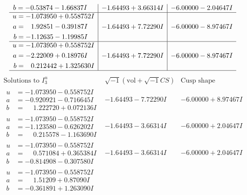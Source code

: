 \documentclass[1p]{elsarticle_modified}
\theoremstyle{definition}
\newcommand{\I}{\sqrt{-1}}
\begin{document}
$$\begin{array}{c|c|c}
\begin{aligned}
b &= -0.53874 - 1.66837 I\end{aligned}
 & -1.64493 + 3.66314 I & -6.00000 - 2.04647 I \\ \hline\begin{aligned}
u &= -1.073950 + 0.558752 I \\
a &= \phantom{-}1.92851 - 0.39187 I \\
b &= -1.12635 - 1.19985 I\end{aligned}
 & -1.64493 + 7.72290 I & -6.00000 - 8.97467 I \\ \hline\begin{aligned}
u &= -1.073950 + 0.558752 I \\
a &= -2.22009 + 0.18976 I \\
b &= \phantom{-}0.212442 + 1.325630 I\end{aligned}
 & -1.64493 + 7.72290 I & -6.00000 - 8.97467 I\\
 \hline 
 \end{array}$$\newpage$$\begin{array}{c|c|c}  
\text{Solutions to }I^u_{3}& \I (\text{vol} + \sqrt{-1}CS) & \text{Cusp shape}\\
 \hline 
\begin{aligned}
u &= -1.073950 - 0.558752 I \\
a &= -0.920921 - 0.716645 I \\
b &= \phantom{-}1.222720 + 0.072136 I\end{aligned}
 & -1.64493 - 7.72290 I & -6.00000 + 8.97467 I \\ \hline\begin{aligned}
u &= -1.073950 - 0.558752 I \\
a &= -1.123580 - 0.626202 I \\
b &= \phantom{-}0.215578 - 1.163690 I\end{aligned}
 & -1.64493 - 3.66314 I & -6.00000 + 2.04647 I \\ \hline\begin{aligned}
u &= -1.073950 - 0.558752 I \\
a &= \phantom{-}0.571084 + 0.365384 I \\
b &= -0.814908 - 0.307580 I\end{aligned}
 & -1.64493 - 3.66314 I & -6.00000 + 2.04647 I \\ \hline\begin{aligned}
u &= -1.073950 - 0.558752 I \\
a &= \phantom{-}1.51209 + 0.87090 I \\
b &= -0.361891 + 1.263090 I\end{aligned}

\end{array}$$
\end{document}
